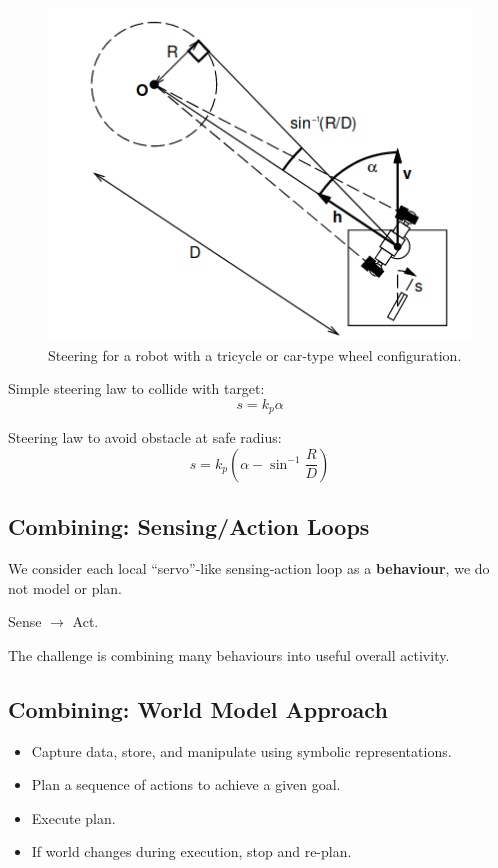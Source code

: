 \documentclass[11pt]{article}
\begin{document}
\begin{figure}[h]
  \caption{Steering for a robot with a tricycle or car-type wheel configuration.}
  \includegraphics[scale=0.4]{steering}
  \centering
\end{figure}

Simple steering law to collide with target:
\[
  s = k_p \alpha
\]
  
Steering law to avoid obstacle at safe radius:
\[
  s = k_p (\alpha - \sin^{-1} \frac{R}{D})
\]

\subsection{Combining: Sensing/Action Loops}
We consider each local ``servo''-like sensing-action loop as a \textbf{behaviour}, we do not model or plan.

Sense $\rightarrow$ Act.

The challenge is combining many behaviours into useful overall activity.

\subsection{Combining: World Model Approach}
\begin{itemize}
  \item Capture data, store, and manipulate using symbolic representations.
  \item Plan a sequence of actions to achieve a given goal.
  \item Execute plan.
  \item If world changes during execution, stop and re-plan.
\end{itemize}
\end{document}
